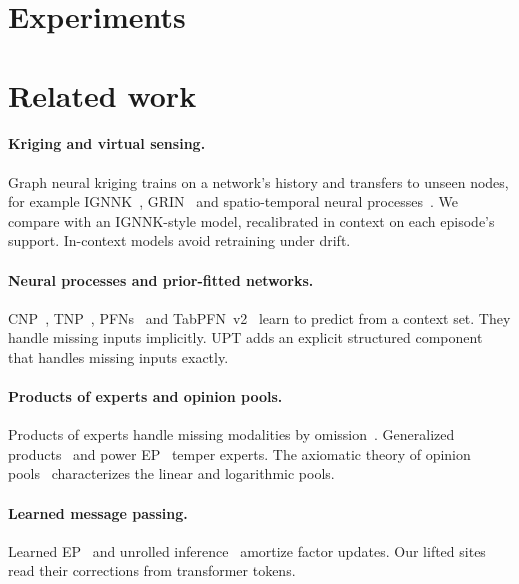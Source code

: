 \documentclass{article}
\begin{document}
\section{Experiments}
\label{sec:experiments}



\section{Related work}
\label{sec:related}

\paragraph{Kriging and virtual sensing.} Graph neural kriging trains on a network's history and transfers to unseen nodes,
for example IGNNK~\citep{wu2021ignnk}, GRIN~\citep{cini2022grin} and spatio-temporal neural
processes~\citep{hu2023stgnp}. We compare with an IGNNK-style model, recalibrated in context on each episode's
support. In-context models avoid retraining under drift.

\paragraph{Neural processes and prior-fitted networks.} CNP~\citep{garnelo2018cnp}, TNP~\citep{nguyen2022tnp},
PFNs~\citep{muller2022pfn} and TabPFN~v2~\citep{hollmann2025tabpfnv2} learn to predict from a context set. They
handle missing inputs implicitly. UPT adds an explicit structured component that handles missing inputs exactly.

\paragraph{Products of experts and opinion pools.} Products of experts handle missing modalities by
omission~\citep{hinton2002poe,wu2018mvae}. Generalized products~\citep{cao2014gpoe} and power EP~\citep{minka2004power}
temper experts. The axiomatic theory of opinion pools~\citep{mcconway1981marginalization,genest1984characterization}
characterizes the linear and logarithmic pools.

\paragraph{Learned message passing.} Learned EP~\citep{heess2013learning} and unrolled inference~\citep{gregor2010lista}
amortize factor updates. Our lifted sites read their corrections from transformer tokens.
\end{document}
